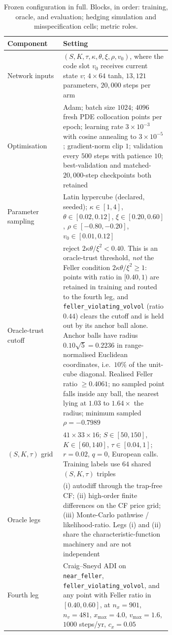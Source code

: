 \documentclass{article}
\begin{document}
\begin{table}[h]
\caption{Frozen configuration in full. Blocks, in order: training, oracle, and
evaluation; hedging simulation and misspecification cells; metric roles.}
\label{tab:configfull}
\centering\footnotesize\setlength{\tabcolsep}{4pt}
\begin{tabular}{@{}lp{0.66\linewidth}@{}}
\toprule
Component & Setting \\
\midrule
Network inputs & $(S, K, \tau, \kappa, \theta, \xi, \rho, v_0)$, where the code slot $v_0$ receives current state $v$; $4\times64$ tanh, $13{,}121$ parameters, $20{,}000$ steps per arm \\
Optimisation & Adam; batch size $1024$; $4096$ fresh PDE collocation points per epoch; learning rate $3\times10^{-3}$ with cosine annealing to $3\times10^{-5}$; gradient-norm clip $1$; validation every $500$ steps with patience $10$; best-validation and matched-$20{,}000$-step checkpoints both retained \\
Parameter sampling & Latin hypercube (declared, seeded); $\kappa\in[1,4]$, $\theta\in[0.02,0.12]$, $\xi\in[0.20,0.60]$, $\rho\in[-0.80,-0.20]$, $v_0\in[0.01,0.12]$ \\
Oracle-trust cutoff & reject $2\kappa\theta/\xi^{2}<0.40$. This is an oracle-trust threshold, \emph{not} the Feller condition $2\kappa\theta/\xi^{2}\geq 1$: points with ratio in $[0.40,1)$ are retained in training and routed to the fourth leg, and \texttt{feller\_violating\_volvol} (ratio $0.44$) clears the cutoff and is held out by its anchor ball alone. Anchor balls have radius $0.10\sqrt{5}=0.2236$ in range-normalised Euclidean coordinates, i.e.\ $10\%$ of the unit-cube diagonal. Realised Feller ratio $\geq 0.4061$; no sampled point falls inside any ball, the nearest lying at $1.03$ to $1.64\times$ the radius; minimum sampled $\rho = -0.7989$ \\
$(S,K,\tau)$ grid & $41\times33\times16$; $S\in[50,150]$, $K\in[60,140]$, $\tau\in[0.04,1]$; $r=0.02$, $q=0$, European calls. Training labels use $64$ shared $(S,K,\tau)$ triples \\
Oracle legs & (i) autodiff through the trap-free CF; (ii) high-order finite differences on the CF price grid; (iii) Monte-Carlo pathwise / likelihood-ratio. Legs (i) and (ii) share the characteristic-function machinery and are not independent \\
Fourth leg & Craig--Sneyd ADI on \texttt{near\_feller}, \texttt{feller\_violating\_volvol}, and any point with Feller ratio in $[0.40,0.60]$, at $n_x{=}901$, $n_v{=}481$, $x_{\max}{=}4.0$, $v_{\max}{=}1.6$, $1000$ steps/yr, $c_x{=}0.05$ \\

\end{tabular}
\end{table}
\end{document}

